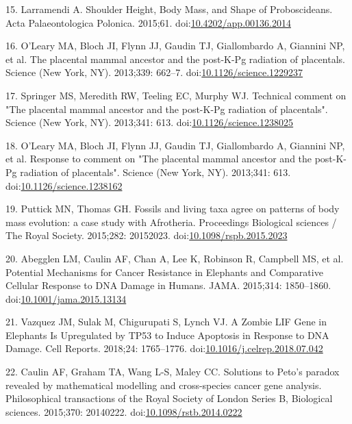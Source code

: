 \documentclass[10pt,letterpaper]{article}
\begin{document}
\leavevmode\hypertarget{ref-Larramendi:20151c2}{}%
15. Larramendi A. Shoulder Height, Body Mass, and Shape of
Proboscideans. Acta Palaeontologica Polonica. 2015;61.
doi:\href{https://doi.org/10.4202/app.00136.2014}{10.4202/app.00136.2014}

\leavevmode\hypertarget{ref-OLeary2013a}{}%
16. O'Leary MA, Bloch JI, Flynn JJ, Gaudin TJ, Giallombardo A, Giannini
NP, et al. The placental mammal ancestor and the post-K-Pg radiation of
placentals. Science (New York, NY). 2013;339: 662--7.
doi:\href{https://doi.org/10.1126/science.1229237}{10.1126/science.1229237}

\leavevmode\hypertarget{ref-Springer2013}{}%
17. Springer MS, Meredith RW, Teeling EC, Murphy WJ. Technical comment
on "The placental mammal ancestor and the post-K-Pg radiation of
placentals". Science (New York, NY). 2013;341: 613.
doi:\href{https://doi.org/10.1126/science.1238025}{10.1126/science.1238025}

\leavevmode\hypertarget{ref-OLeary2013b}{}%
18. O'Leary MA, Bloch JI, Flynn JJ, Gaudin TJ, Giallombardo A, Giannini
NP, et al. Response to comment on "The placental mammal ancestor and the
post-K-Pg radiation of placentals". Science (New York, NY). 2013;341:
613.
doi:\href{https://doi.org/10.1126/science.1238162}{10.1126/science.1238162}

\leavevmode\hypertarget{ref-PuttickAndThomas2015}{}%
19. Puttick MN, Thomas GH. Fossils and living taxa agree on patterns of
body mass evolution: a case study with Afrotheria. Proceedings
Biological sciences / The Royal Society. 2015;282: 20152023.
doi:\href{https://doi.org/10.1098/rspb.2015.2023}{10.1098/rspb.2015.2023}

\leavevmode\hypertarget{ref-Abegglen:JAMA2015}{}%
20. Abegglen LM, Caulin AF, Chan A, Lee K, Robinson R, Campbell MS, et
al. Potential Mechanisms for Cancer Resistance in Elephants and
Comparative Cellular Response to DNA Damage in Humans. JAMA. 2015;314:
1850--1860.
doi:\href{https://doi.org/10.1001/jama.2015.13134}{10.1001/jama.2015.13134}

\leavevmode\hypertarget{ref-Vazquez2018}{}%
21. Vazquez JM, Sulak M, Chigurupati S, Lynch VJ. A Zombie LIF Gene in
Elephants Is Upregulated by TP53 to Induce Apoptosis in Response to DNA
Damage. Cell Reports. 2018;24: 1765--1776.
doi:\href{https://doi.org/10.1016/j.celrep.2018.07.042}{10.1016/j.celrep.2018.07.042}

\leavevmode\hypertarget{ref-Caulin2015}{}%
22. Caulin AF, Graham TA, Wang L-S, Maley CC. Solutions to Peto's
paradox revealed by mathematical modelling and cross-species cancer gene
analysis. Philosophical transactions of the Royal Society of London
Series B, Biological sciences. 2015;370: 20140222.
doi:\href{https://doi.org/10.1098/rstb.2014.0222}{10.1098/rstb.2014.0222}
\end{document}
